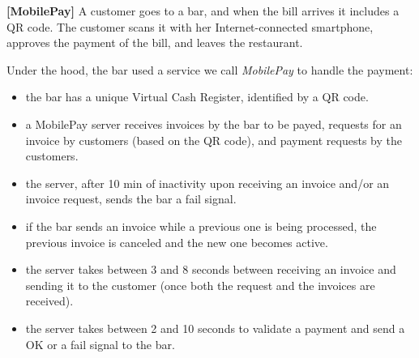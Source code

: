 \documentclass[11pt]{article}
\begin{document}
\begin{exercise} \label{ex:vm2}
\textbf{[MobilePay]}
A customer goes to a bar, and when the bill arrives it includes a QR code. The customer scans it with her Internet-connected smartphone, approves the payment of the bill, and leaves the restaurant.

Under the hood, the bar used a service we call \emph{MobilePay} to handle the payment: %
\begin{itemize}
  \setlength\itemsep{0.3mm}
  \item the bar has a unique Virtual Cash Register, identified by a QR code.
  \item a MobilePay server receives invoices by the bar to be payed, requests for an invoice by customers (based on the QR code), and payment requests by the customers.
  \item the server, after 10 min of inactivity upon receiving an invoice and/or an invoice request, sends the bar a fail signal.
  \item if the bar sends an invoice while a previous one is being processed, the previous invoice is canceled and the new one becomes active.
  \item the server takes between 3 and 8 seconds between receiving an invoice and sending it to the customer (once both the request and the invoices are received).
  \item the server takes between 2 and 10 seconds to validate a payment and send a OK or a fail signal to the bar.
\end{itemize}





\end{exercise}
\end{document}
